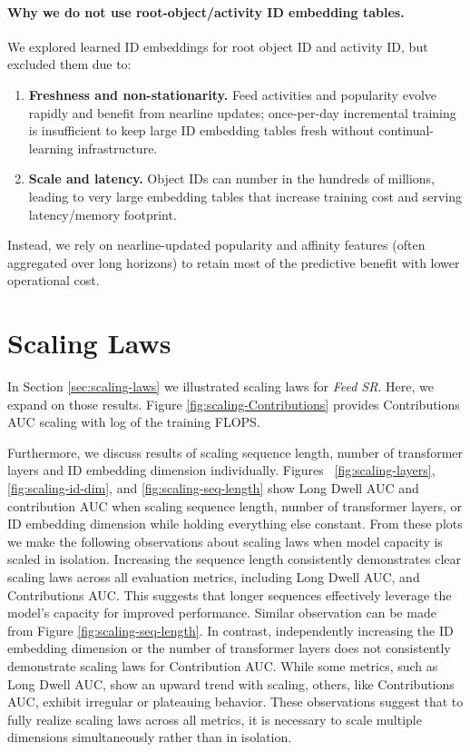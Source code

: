 \documentclass[sigconf]{acmart}
\newcommand{\systemname}{\textit{Feed SR}}
\begin{document}
\paragraph{Why we do not use root-object/activity ID embedding tables.}
We explored learned ID embeddings for root object ID and activity ID, but excluded them due to:
\begin{enumerate}
    \item \textbf{Freshness and non-stationarity.} Feed activities and popularity evolve rapidly and benefit from nearline updates; once-per-day incremental training is insufficient to keep large ID embedding tables fresh without continual-learning infrastructure.
    \item \textbf{Scale and latency.} Object IDs can number in the hundreds of millions, leading to very large embedding tables that increase training cost and serving latency/memory footprint.
\end{enumerate}
Instead, we rely on nearline-updated popularity and affinity features (often aggregated over long horizons) to retain most of the predictive benefit with lower operational cost.


\section{Scaling Laws}\label{app:scaling-laws}
In Section \ref{sec:scaling-laws} we illustrated scaling laws for {\systemname}. Here, we expand on those results. Figure \ref{fig:scaling-Contributions} provides Contributions AUC scaling with log of the training FLOPS. 

Furthermore, we discuss results of scaling sequence length, number of transformer layers and ID embedding dimension individually. Figures ~\ref{fig:scaling-layers}, \ref{fig:scaling-id-dim}, and \ref{fig:scaling-seq-length} show Long Dwell AUC and contribution AUC when scaling sequence length, number of transformer layers, or ID embedding dimension while holding everything else constant. From these plots we make the following observations about scaling laws when model capacity is scaled in isolation. Increasing the sequence length consistently demonstrates clear scaling laws across all evaluation metrics, including Long Dwell AUC, and Contributions AUC. This suggests that longer sequences effectively leverage the model's capacity for improved performance. Similar observation can be made from Figure \ref{fig:scaling-seq-length}. In contrast, independently increasing the ID embedding dimension or the number of transformer layers does not consistently demonstrate scaling laws for Contribution AUC. While some metrics, such as Long Dwell AUC, show an upward trend with scaling, others, like Contributions AUC, exhibit irregular or plateauing behavior. These observations suggest that to fully realize scaling laws across all metrics, it is necessary to scale multiple dimensions simultaneously rather than in isolation. 
\end{document}
